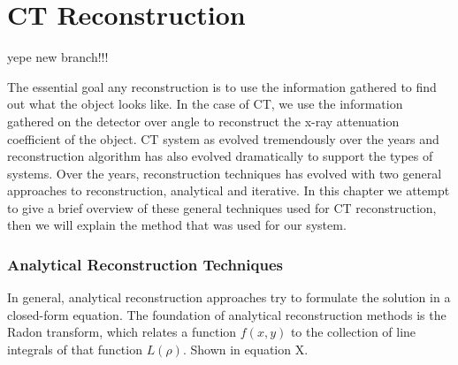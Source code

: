 \chapter{CT Reconstruction}
yepe new branch!!!


The essential goal any reconstruction is to use the information gathered to find out what the object looks like.  In the case of CT, we use the information gathered on the detector over angle to reconstruct the x-ray attenuation coefficient of the object.  CT system as evolved tremendously over the years and reconstruction algorithm has also evolved dramatically to support the types of systems. Over the years, reconstruction techniques has evolved with two general approaches to reconstruction, analytical and iterative.  In this chapter we attempt to give a brief overview of these general techniques used for CT reconstruction, then we will explain the method that was used for our system.

\subsection{Analytical Reconstruction Techniques}
In general, analytical reconstruction approaches try to formulate the solution in a closed-form equation.  The foundation of analytical reconstruction methods is the Radon transform, which relates a function $f(x,y)$ to the collection of line integrals of that function $L(\rho)$.  Shown in equation X. 

\begin{equation}
\label{eq:radon}
\end{equation}

